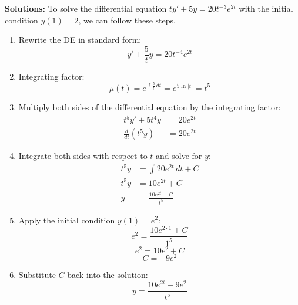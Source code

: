\ifnum {} {\color{DarkBlue} 
\textbf{Solutions:}
To solve the differential equation \( t y' + 5 y = 20 t^{-3} e^{2t} \) with the initial condition \( y(1) = 2 \), we can follow these steps.
\begin{enumerate}
    \item Rewrite the DE in standard form:
   \[ y' + \frac{5}{t} y = 20 t^{-4} e^{2t} \]
   \item Integrating factor:
   \[ \mu(t) = e^{\int \frac{5}{t} \, dt} = e^{5 \ln |t|} = t^5 \]
   \item Multiply both sides of the differential equation by the integrating factor:
   \begin{align*}
       t^5 y' + 5 t^4 y &= 20 e^{2t} \\
       \frac{d}{dt} (t^5 y) &= 20 e^{2t}
   \end{align*} 
   \item Integrate both sides with respect to \( t \) and solve for $y$:
   \begin{align}
       t^5 y &= \int 20 e^{2t} \, dt + C \\
       t^5 y &= 10 e^{2t} + C \\
        y &= \frac{10 e^{2t} + C}{t^5} 
   \end{align} 
   \item Apply the initial condition \( y(1) = e^2 \):
   \[ e^2 = \frac{10 e^{2 \cdot 1} + C}{1^5} \]
   \[ e^2 = 10 e^2 + C \]
   \[ C = - 9 e^2 \]
   \item Substitute \( C \) back into the solution:
   \[ y = \frac{10 e^{2t} - 9 e^2}{t^5} \]
\end{enumerate}
} 
\else 
\newpage
\fi
\fi   
